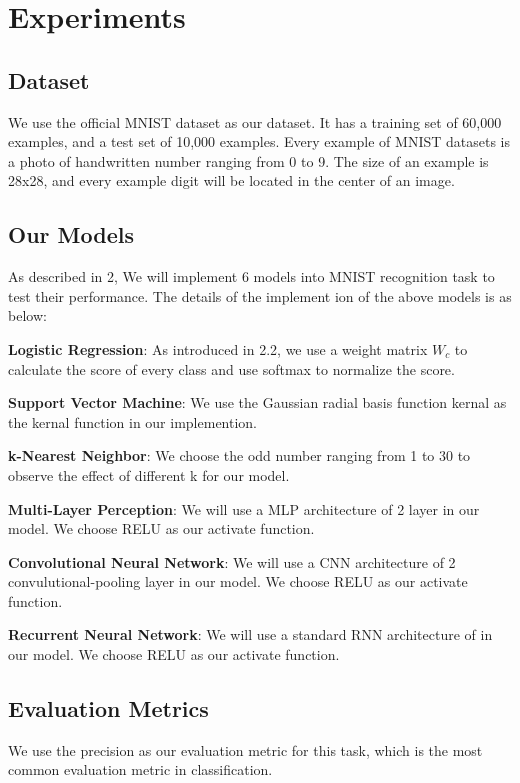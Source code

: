 \documentclass[sigchi]{acmart}
\begin{document}
\section{Experiments}

\subsection{Dataset}
We use the official MNIST dataset as our dataset. It has a training set of 60,000 examples, and a test set of 10,000 examples. Every example of MNIST datasets is a photo of handwritten number ranging from 0 to 9. The size of an example is 28x28, and every example digit will be located in the center of an image. 



\subsection{Our Models}
As described in 2, We will implement 6 models into MNIST recognition task to test their performance. The details of the implement ion of the above models is as below:

\textbf{Logistic Regression}: As introduced in 2.2, we use a weight matrix $W_c$ to calculate the score of every class and use softmax to normalize the score.


\textbf{Support Vector Machine}: We use the Gaussian radial basis function kernal as the kernal function in our implemention.


\textbf{k-Nearest Neighbor}: We choose the odd number ranging from 1 to 30 to observe the effect of different k for our model.


\textbf{Multi-Layer Perception}: We will use a MLP architecture of 2 layer in our model. We choose RELU as our activate function.

\textbf{Convolutional Neural Network}: We will use a CNN architecture of 2 convulutional-pooling layer in our model. We choose RELU as our activate function.

\textbf{Recurrent Neural Network}: We will use a standard RNN architecture of in our model. We choose RELU as our activate function.

\subsection{Evaluation Metrics}
We use the precision as our evaluation metric for this task, which is the most common evaluation metric in classification.
\end{document}
